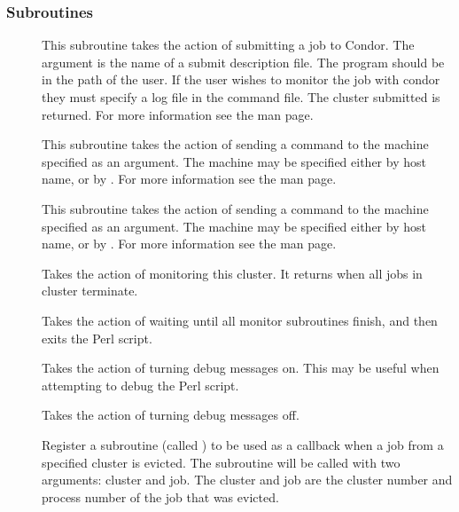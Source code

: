 \subsubsection{Subroutines}
\begin{description}
	\item []
	This subroutine takes the action of submitting a job to Condor.
	The argument is the name of a submit description file.
	The  program should be in the
	path of the user.  If the user wishes to monitor the job with condor
	they must specify a log file in the command file.  The cluster
	submitted is returned. For more information
	see the  man page.
	
	\item []
	This subroutine takes the action of sending a
	 command to the machine specified as an argument.
	The machine may be specified
	either by host name, or by .  For more information
	see the  man page.

	\item []
	This subroutine takes the action of sending a
	 command to the machine specified as an argument.
	The machine may be specified either
 	by host name, or by .  For more information see
	the  man page.

	\item []
	Takes the action of monitoring this cluster.
	It returns when all jobs in cluster terminate.
	
	\item [] 
	Takes the action of waiting until all monitor subroutines finish,
	and then exits the Perl script.

	\item []
	Takes the action of turning debug messages on.
	This may be useful when attempting to debug the Perl script.

	\item []
	Takes the action of turning debug messages off.

	\item []
	Register a subroutine (called )
	to be used as a callback when a job from
	a specified cluster is evicted.  The subroutine will be
	called with two arguments: cluster and job. The cluster
	and job are the cluster number and process number of the job that
	was evicted.
	

\end{description}

